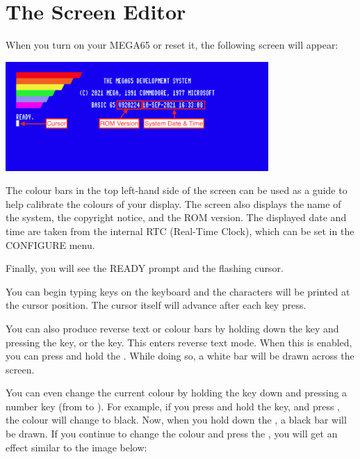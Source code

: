 \section{The Screen Editor}
\label{sec:screen-editor}

When you turn on your MEGA65 or reset it, the following screen will appear:

\begin{center}
\includegraphics[width={10cm}]{images/introduction-screen/layout.png}
\end{center}

The colour bars in the top left-hand side of the screen can be used
as a guide to help calibrate the colours of your display.
The screen also displays the name of the system,
the copyright notice, and the ROM version.
The displayed date and time are taken from the internal RTC
(Real-Time Clock), which can be set in the CONFIGURE menu.

Finally, you will see the READY prompt and the flashing cursor.

You can begin typing keys on the keyboard and the characters will be
printed at the cursor position. The cursor itself will advance after
each key press.

You can also produce reverse text or colour bars by holding down the  key and pressing the  key, or the  key. This enters reverse text mode. When this is enabled, you can press and hold the . While doing so, a white bar will be drawn across the screen.

You can even change the current colour by holding the  key down and pressing a number key (from  to ). For example, if you press and hold the  key, and press , the colour will change to black. Now, when you hold down the , a black bar will be drawn. If you continue to change the colour and press the , you will get an effect similar to the image below:


